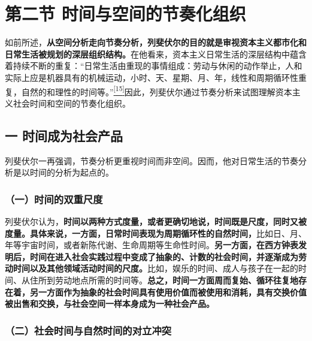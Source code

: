 \documentclass[UTF8, fontset = sourcesans, a4paper, oneside, zihao =
-4, scheme=chinese, no-math, space=true]{ctexbook}
\begin{document}
\protect\hypertarget{part0009_split_002.html}{}{}

\hypertarget{part0009_split_002.htmlux5cux23b015}{\section{第二节
时间与空间的节奏化组织}\label{part0009_split_002.htmlux5cux23b015}}

如前所述，\textbf{从空间分析走向节奏分析，列斐伏尔的目的就是审视资本主义都市化和日常生活被规划的深层组织结构。}在他看来，资本主义日常生活的深层结构中蕴含着持续不断的重复：``日常生活由重现的事情组成：劳动与休闲的动作举止，人和实际上应是机器具有的机械运动，小时、天、星期、月、年，线性和周期循环性重复，自然的和理性的时间等。''\protect\hypertarget{part0009_split_002.htmlux5cux23w15}{}{}\protect\hyperlink{part0009_split_004.htmlux5cux23m15}{\textsuperscript{{[}15{]}}}因此，列斐伏尔通过节奏分析来试图理解资本主义社会时间和空间的节奏化组织。

\subsection{一
时间成为社会产品}\label{part0009_split_002.htmlux5cux23c048}

列斐伏尔一再强调，节奏分析更重视时间而非空间。因而，他对日常生活的节奏分析是以时间的分析为起点的。

\subsubsection{（一）时间的双重尺度}\label{part0009_split_002.htmlux5cux23d030}

列斐伏尔认为，\textbf{时间以两种方式度量，或者更确切地说，时间既是尺度，同时又被度量。具体来说，一方面，日常时间表现为周期循环性的自然时间，}比如日、月、年等宇宙时间，或者新陈代谢、生命周期等生命性时间。\textbf{另一方面，在西方钟表发明后，时间在进入社会实践过程中变成了抽象的、计数的社会时间，并逐渐成为劳动时间以及其他领域活动时间的尺度。}比如，娱乐的时间、成人与孩子在一起的时间、从住所到劳动地点所需的时间等。\textbf{总之，时间一方面周而复始、循环往复地存在着，另一方面作为抽象的社会时间具有使用价值而被使用和消耗，具有交换价值被出售和交换，与社会空间一样本身成为一种社会产品。}

\subsubsection{（二）社会时间与自然时间的对立冲突}\label{part0009_split_002.htmlux5cux23d031}
\end{document}
